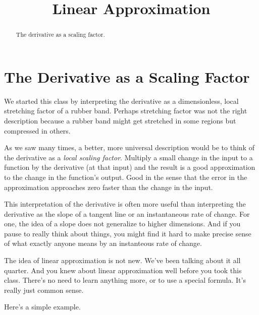 \documentclass{ximera}
\title{Linear Approximation}
\begin{document}
\begin{abstract}
The derivative as a scaling factor.
\end{abstract}
\maketitle


\section{The Derivative as a Scaling Factor}

We started this class by interpreting the derivative as a dimensionless, local stretching factor of a rubber band. Perhaps stretching factor was not the right description because a rubber band might get stretched in some regions but compressed in others. 

As we saw many times, a better, more universal description would be to think of the derivative as a \emph{local scaling factor}. Multiply a small change in the input to a function by the derivative (at that input) and the result is a good approximation to the change in the function's output. Good in the sense that the error in the approximation approaches zero faster than the change in the input.

This interpretation of the derivative is often more useful than interpreting the derivative as the slope of a tangent line or an instantaneous rate of change. For one, the idea of a slope does not generalize to higher dimensions. And if you pause to really think about things, you might find it hard to make precise sense of what exactly anyone means by an instanteous rate of change. 

The idea of linear approximation is not new. We've been talking about it all quarter. And you knew about linear approximation well before you took this class. There's no need to learn anything more, or to use a special formula. It's really just common sense. 

Here's a simple example.
\end{document}
